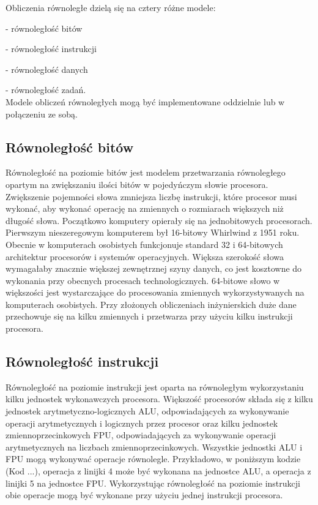 Obliczenia równoległe dzielą się na cztery różne modele:

- równoległość bitów

- równoległość instrukcji

- równoległość danych

- równoległość zadań.\\

Modele obliczeń równoległych mogą być implementowane oddzielnie lub w połączeniu ze sobą.

\subsection{Równoległość bitów}\label{sec:bitp}

Równoległość na poziomie bitów jest modelem przetwarzania równoległego opartym na zwiększaniu ilości bitów w pojedyńczym słowie procesora. Zwiększenie pojemności słowa zmniejsza liczbę instrukcji, które procesor musi wykonać, aby wykonać operację na zmiennych o rozmiarach większych niż długość słowa.
Początkowo komputery opierały się na jednobitowych procesorach. Pierwszym nieszeregowym komputerem był 16-bitowy Whirlwind z 1951 roku. Obecnie w komputerach osobistych funkcjonuje standard 32 i 64-bitowych architektur procesorów i systemów operacyjnych. Większa szerokość słowa wymagałaby znacznie większej zewnętrznej szyny danych, co jest kosztowne do wykonania przy obecnych procesach technologicznych. 64-bitowe słowo w większości jest wystarczające do  procesowania zmiennych wykorzystywanych na komputerach osobistych. Przy złożonych obliczeniach inżynierskich duże dane przechowuje się na kilku zmiennych i przetwarza przy użyciu kilku instrukcji procesora.

\subsection{Równoległość instrukcji}\label{sec:instp}

Równoległość na poziomie instrukcji jest oparta na równoległym wykorzystaniu kilku jednostek wykonawczych procesora. Większość procesorów składa się z kilku jednostek arytmetyczno-logicznych ALU, odpowiadających za wykonywanie operacji arytmetycznych i logicznych przez procesor oraz kilku jednostek zmiennoprzecinkowych FPU, odpowiadających za wykonywanie operacji arytmetycznych na liczbach zmiennoprzecinkowych. Wszystkie jednostki ALU i FPU mogą wykonywać operacje równolegle. Przykładowo, w poniższym kodzie (Kod ...), operacja z linijki 4 może być wykonana na jednostce ALU, a operacja z linijki 5 na jednostce FPU. Wykorzystując równoległość na poziomie instrukcji obie operacje mogą być wykonane przy użyciu jednej instrukcji procesora.

